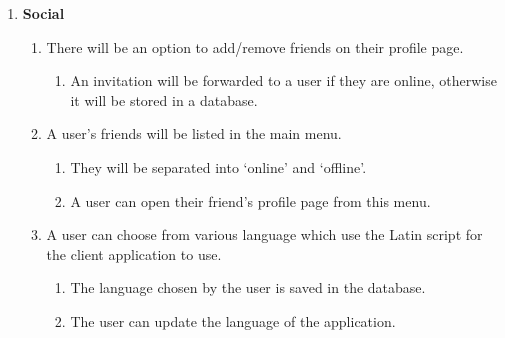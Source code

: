\documentclass{article}
\begin{document}
\begin{enumerate}
    \item \textbf{Social}
    \begin{enumerate}
        \item There will be an option to add/remove friends on their profile page.
        \begin{enumerate}
            \item An invitation will be forwarded to a user if they are online, otherwise it will be stored in a database.
        \end{enumerate}
        \item A user's friends will be listed in the main menu.
        \begin{enumerate}
            \item They will be separated into `online' and `offline'.
            \item A user can open their friend's profile page from this menu.
        \end{enumerate}
        \item A user can choose from various language which use the Latin script for the client application to use.
        \begin{enumerate}
            \item The language chosen by the user is saved in the database.
            \item The user can update the language of the application.
        \end{enumerate}
    \end{enumerate}


\end{enumerate}
\end{document}
